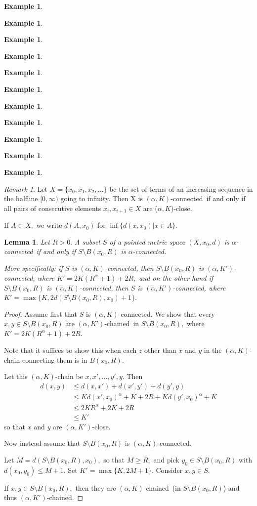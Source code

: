\documentclass[12pt]{amsart}
\newtheorem{lemma}[theorem]{Lemma}
\theoremstyle{definition}
\newtheorem{example}[theorem]{Example}
\theoremstyle{remark}
\newtheorem{remark}[theorem]{Remark}
\numberwithin{equation}{section}
\newcommand{\ak}{$(\alpha,K)$}
\newcommand{\akp}{$(\alpha,K')$}
\newcommand{\akch}{$(\alpha,K)$-chained}
\newcommand{\akpch}{$(\alpha,K')$-chained}
\newcommand{\akconn}{$(\alpha,K)$-connected}
\newcommand{\akpconn}{$(\alpha,K')$-connected}
\newcommand{\aconn}{$\alpha$-connected}
\begin{document}
\begin{example}
\begin{example}
\begin{example}
\begin{example}
\begin{example}
\begin{example}
\begin{example}
\begin{example}
\begin{example}
\begin{example}
\begin{example}
\begin{remark}\label{l1}
Let $X = \{x_0, x_1, x_2, \ldots \}$ be the set of terms of an
increasing sequence in the halfline $[0,\infty)$ going to infinity.
  Then X is \akconn \ if and only if all pairs of consecutive elements
  $x_i,x_{i+1}\in X$ are ($\alpha,K$)-close.
\end{remark}

If $A\subset X,$ we write $d(A,x_0)$ for $\inf\{d(x,x_0) | x\in A\}.$

\begin{lemma}
Let $R>0.$ A subset $S$ of a pointed metric space $(X,x_0,d)$ is
\aconn \ if and only if $S \setminus B(x_0,R)$ is \aconn.

More specifically: if $S$ is \akconn, then $S \setminus B(x_0,R)$ is
\akpconn, where $K'= 2K(R^\alpha +1) +2R,$ and on the other hand if $S
\setminus B(x_0,R)$ is \akconn, then $S$ is \akpconn, where
$K'=\max\{K, 2d(S \setminus B(x_0,R), x_0)+1\}.$
\end{lemma}

\begin{proof}
Assume first that $S$ is \akconn. We show that every $x,y \in
S\setminus B(x_0,R)$ are \akpch \ in $S\setminus B(x_0,R),$ where $K'
= 2K(R^\alpha +1) +2R.$

Note that it suffices to show this when each $z$ other than $x$ and
$y$ in the \ak-chain connecting them is in $B(x_0,R).$

Let this \ak-chain be $x,x',\ldots,y',y.$ Then
\begin{equation*}
\begin{split}
d(x,y) &\leq d(x,x') + d(x',y') + d(y',y)\\
	& \leq Kd(x',x_0)^\alpha +K + 2R + Kd(y',x_0)^\alpha +K\\
	& \leq 2KR^\alpha + 2K +2R\\
	& \leq K'
 \end{split}
\end{equation*}
so that $x$ and $y$ are \akp-close.

Now instead assume that $S \setminus B(x_0,R)$ is \akconn.

Let $M=d(S \setminus B(x_0,R), x_0),$ so that $M \geq R,$ and pick
$y_0 \in S \setminus B(x_0,R)$ with $d(x_0,y_0) \leq M+1.$ Set
$K'=\max\{K, 2M+1\}.$ Consider $x,y \in S.$

If $x,y \in S \setminus B(x_0,R),$ then they are \akch \ (in $S
\setminus B(x_0,R)$) and thus \akpch.


\end{proof}
\end{example}
\end{example}
\end{example}
\end{example}
\end{example}
\end{example}
\end{example}
\end{example}
\end{example}
\end{example}
\end{example}
\end{document}
